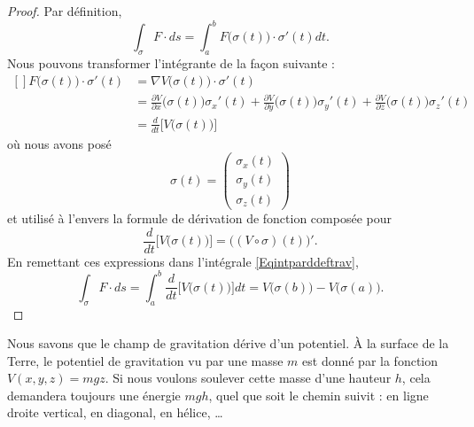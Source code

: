 \begin{proof}
    Par définition,
    \begin{equation}        \label{Eqintparddeftrav}
        \int_{\sigma} F\cdot ds=\int_a^b F\big( \sigma(t) \big)\cdot \sigma'(t)dt.
    \end{equation}
    Nous pouvons transformer l'intégrante de la façon suivante :
    \begin{equation}
        \begin{aligned}[]
            F\big( \sigma(t) \big)\cdot\sigma'(t)&=\nabla V\big( \sigma(t) \big)\cdot\sigma'(t)\\
            &=\frac{ \partial V }{ \partial x }\big( \sigma(t) \big)\sigma_x'(t) +\frac{ \partial V }{ \partial y }\big( \sigma(t) \big)\sigma_y'(t) +\frac{ \partial V }{ \partial z }\big( \sigma(t) \big)\sigma_z'(t)\\
            &=\frac{ d }{ dt }\Big[ V\big( \sigma(t) \big) \Big]
        \end{aligned}
    \end{equation}
    où nous avons posé
    \begin{equation}
        \sigma(t)=\begin{pmatrix}
            \sigma_x(t)    \\ 
            \sigma_y(t)    \\ 
            \sigma_z(t)    
        \end{pmatrix}
    \end{equation}
    et utilisé à l'envers la formule de dérivation de fonction composée pour
    \begin{equation}
             \frac{ d }{ dt }\Big[ V\big( \sigma(t) \big) \Big]=\Big( (V\circ\sigma)(t) \Big)'.
    \end{equation}
    En remettant ces expressions dans l'intégrale \eqref{Eqintparddeftrav},
    \begin{equation}
        \int_{\sigma}F\cdot ds=\int_a^b\frac{ d }{ dt }\Big[ V\big( \sigma(t) \big) \Big]dt=V\big( \sigma(b) \big)-V\big( \sigma(a) \big).
    \end{equation}
\end{proof}

\begin{example}
    Nous savons que le champ de gravitation dérive d'un potentiel. À la surface de la Terre, le potentiel de gravitation vu par une masse $m$ est donné par la fonction $V(x,y,z)=mgz$. Si nous voulons soulever cette masse d'une hauteur $h$, cela demandera toujours une énergie $mgh$, quel que soit le chemin suivit : en ligne droite vertical, en diagonal, en hélice, \ldots
\end{example}

